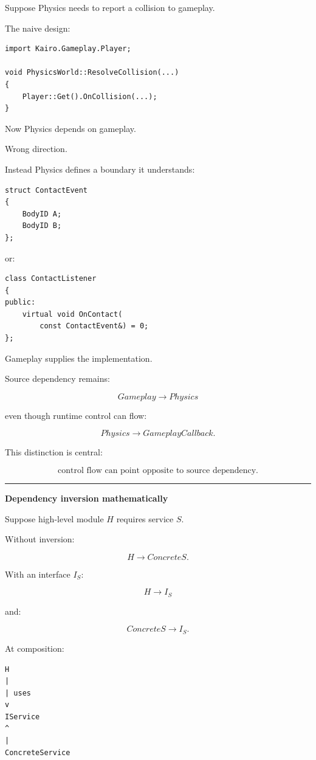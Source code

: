 Suppose Physics needs to report a collision to gameplay.

The naive design:

\begin{verbatim}
import Kairo.Gameplay.Player;

void PhysicsWorld::ResolveCollision(...)
{
    Player::Get().OnCollision(...);
}
\end{verbatim}

Now Physics depends on gameplay.

Wrong direction.

Instead Physics defines a boundary it understands:

\begin{verbatim}
struct ContactEvent
{
    BodyID A;
    BodyID B;
};
\end{verbatim}

or:

\begin{verbatim}
class ContactListener
{
public:
    virtual void OnContact(
        const ContactEvent&) = 0;
};
\end{verbatim}

Gameplay supplies the implementation.

Source dependency remains:

\[
Gameplay\rightarrow Physics
\]

even though runtime control can flow:

\[
Physics\rightarrow GameplayCallback.
\]

This distinction is central:

\[
\boxed{
\text{control flow can point opposite to source dependency}.
}
\]

\begin{center}\rule{0.5\linewidth}{0.5pt}\end{center}

\textbf{Dependency inversion mathematically}

Suppose high-level module \(H\) requires service \(S\).

Without inversion:

\[
H\rightarrow ConcreteS.
\]

With an interface \(I_S\):

\[
H\rightarrow I_S
\]

and:

\[
ConcreteS\rightarrow I_S.
\]

At composition:

\begin{verbatim}
H
|
| uses
v
IService
^
|
ConcreteService
\end{verbatim}

